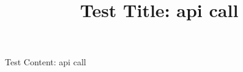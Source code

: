 \documentclass{article}
\title{Test Title: api call}
\begin{document}
\maketitle
Test Content: api call
\end{document}
